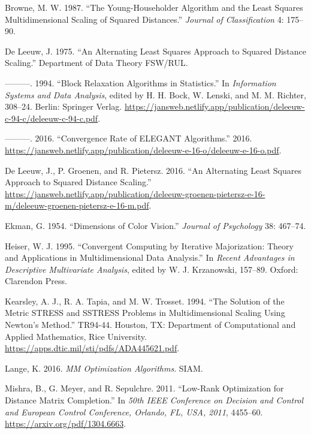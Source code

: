 \documentclass[
  12pt,
  letterpaper,
  DIV=11,
  numbers=noendperiod]{scrartcl}
\newlength{\cslhangindent}
\newenvironment{CSLReferences}[2] %
 {\begin{list}{}{%
  \setlength{\itemindent}{0pt}
  \setlength{\leftmargin}{0pt}
  \setlength{\parsep}{0pt}
  \ifodd #1
   \setlength{\leftmargin}{\cslhangindent}
   \setlength{\itemindent}{-1\cslhangindent}
  \fi
  \setlength{\itemsep}{#2\baselineskip}}}
 {\end{list}}
\begin{document}
\label{refs}
\begin{CSLReferences}{1}{0}
Browne, M. W. 1987. {``{The Young-Householder Algorithm and the Least
Squares Multidimensional Scaling of Squared Distances}.''} \emph{Journal
of Classification} 4: 175--90.

De Leeuw, J. 1975. {``{An Alternating Least Squares Approach to Squared
Distance Scaling}.''} Department of Data Theory FSW/RUL.

---------. 1994. {``{Block Relaxation Algorithms in Statistics}.''} In
\emph{Information Systems and Data Analysis}, edited by H. H. Bock, W.
Lenski, and M. M. Richter, 308--24. Berlin: Springer Verlag.
\url{https://jansweb.netlify.app/publication/deleeuw-c-94-c/deleeuw-c-94-c.pdf}.

---------. 2016. {``Convergence Rate of {ELEGANT} Algorithms.''} 2016.
\url{https://jansweb.netlify.app/publication/deleeuw-e-16-o/deleeuw-e-16-o.pdf}.

De Leeuw, J., P. Groenen, and R. Pietersz. 2016. {``An Alternating Least
Squares Approach to Squared Distance Scaling.''}
\url{https://jansweb.netlify.app/publication/deleeuw-groenen-pietersz-e-16-m/deleeuw-groenen-pietersz-e-16-m.pdf}.

Ekman, G. 1954. {``{Dimensions of Color Vision}.''} \emph{Journal of
Psychology} 38: 467--74.

Heiser, W. J. 1995. {``{Convergent Computing by Iterative Majorization:
Theory and Applications in Multidimensional Data Analysis}.''} In
\emph{Recent Advantages in Descriptive Multivariate Analysis}, edited by
W. J. Krzanowski, 157--89. Oxford: Clarendon Press.

Kearsley, A. J., R. A. Tapia, and M. W. Trosset. 1994. {``{The Solution
of the Metric STRESS and SSTRESS Problems in Multidimensional Scaling
Using Newton's Method}.''} TR94-44. Houston, TX: {Department of
Computational and Applied Mathematics, Rice University}.
\url{https://apps.dtic.mil/sti/pdfs/ADA445621.pdf}.

Lange, K. 2016. \emph{MM Optimization Algorithms}. SIAM.

Mishra, B., G. Meyer, and R. Sepulchre. 2011. {``Low-Rank Optimization
for Distance Matrix Completion.''} In \emph{50th IEEE Conference on
Decision and Control and European Control Conference, Orlando, FL, USA,
2011}, 4455--60. \url{https://arxiv.org/pdf/1304.6663}.


\end{CSLReferences}
\end{document}

